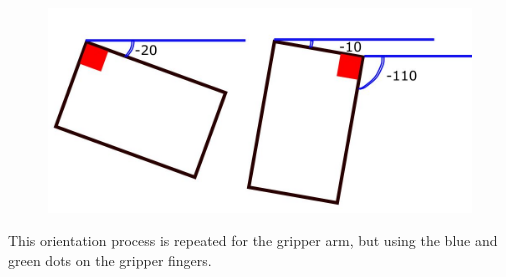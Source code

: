 \documentclass[11pt,a4paper]{report}
\begin{document}
\begin{figure}[h]
\centering
\includegraphics[width=0.7\linewidth]{"angle_issue"}
\caption{}
\label{fig:angleissue}
\end{figure}

This orientation process is repeated for the gripper arm, but using the blue and green dots on the gripper fingers. 
	
\end{document}
